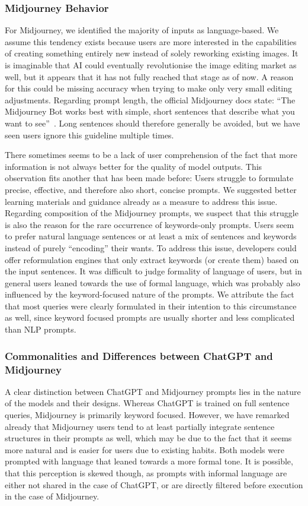 \subsubsection{Midjourney Behavior}
For Midjourney, we identified the majority of inputs as language-based.
We assume this tendency exists because users are more interested in the capabilities of creating
something entirely new instead of solely reworking existing images.
It is imaginable that AI could eventually revolutionise the image editing market as well, but
it appears that it has not fully reached that stage as of now.
A reason for this could be missing accuracy when trying to make only very small editing adjustments.
Regarding prompt length, the official Midjourney docs state: ``The Midjourney Bot works best with
simple, short sentences that describe what you want to see''~\cite{midjourney_documentation_2023}.
Long sentences should therefore generally be avoided, but we have seen users ignore this guideline
multiple times.

There sometimes seems to be a lack of user comprehension of the fact that more information is not
always better for the quality of model outputs.
This observation fits another that has been made before:
Users struggle to formulate precise, effective, and therefore also short, concise prompts.
We suggested better learning materials and guidance already as a measure to address this issue.
Regarding composition of the Midjourney prompts, we suspect that this struggle is also the reason
for the rare occurrence of keywords-only prompts.
Users seem to prefer natural language sentences or at least a mix of sentences and keywords
instead of purely ``encoding'' their wants.
To address this issue, developers could offer reformulation engines that only extract keywords (or
create them) based on the input sentences.
It was difficult to judge formality of language of users, but in general users leaned towards the
use of formal language, which was probably also influenced by the keyword-focused nature of the prompts.
We attribute the fact that most queries were clearly formulated in their intention to this
circumstance as well,
since keyword focused prompts are usually shorter and less complicated than NLP prompts.

\subsubsection{Commonalities and Differences between ChatGPT and Midjourney}
A clear distinction between ChatGPT and Midjourney prompts lies in the nature of the models and
their designs.
Whereas ChatGPT is trained on full sentence queries, Midjourney is primarily keyword focused.
However, we have remarked already that Midjourney users tend to at least partially integrate
sentence structures in their prompts as well, which may be due to the fact that it seems more
natural and is easier for users due to existing habits.
Both models were prompted with language that leaned towards a more formal tone.
It is possible, that this perception is skewed though, as prompts with informal language are
either not shared in the case of ChatGPT, or are directly filtered before execution in the case
of Midjourney.


